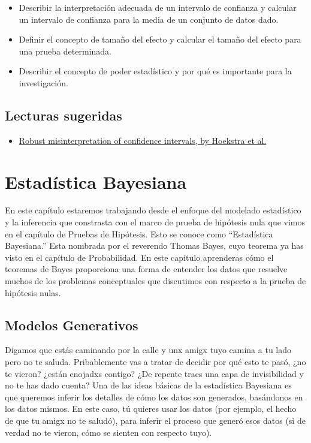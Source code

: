 \documentclass[
  12pt,
]{book}
\providecommand{\tightlist}{%
  \setlength{\itemsep}{0pt}\setlength{\parskip}{0pt}}
\theoremstyle{definition}
\theoremstyle{definition}
\theoremstyle{definition}
\theoremstyle{remark}
\begin{document}
\begin{itemize}
\tightlist
\item
  Describir la interpretación adecuada de un intervalo de confianza y calcular un intervalo de confianza para la media de un conjunto de datos dado.
\item
  Definir el concepto de tamaño del efecto y calcular el tamaño del efecto para una prueba determinada.
\item
  Describir el concepto de poder estadístico y por qué es importante para la investigación.
\end{itemize}

\hypertarget{lecturas-sugeridas}{%
\section{Lecturas sugeridas}\label{lecturas-sugeridas}}

\begin{itemize}
\tightlist
\item
  \href{http://www.ejwagenmakers.com/inpress/HoekstraEtAlPBR.pdf}{Robust misinterpretation of confidence intervals, by Hoekstra et al.}
\end{itemize}

\hypertarget{estaduxedstica-bayesiana}{%
\chapter{Estadística Bayesiana}\label{estaduxedstica-bayesiana}}

En este capítulo estaremos trabajando desde el enfoque del modelado estadístico y la inferencia que constrasta con el marco de prueba de hipótesis nula que vimos en el capítulo de Pruebas de Hipótesis.
Esto se conoce como ``Estadística Bayesiana.'' Esta nombrada por el reverendo Thomas Bayes, cuyo teorema ya has visto en el capítulo de Probabilidad. En este capítulo aprenderas cómo el teoremas de Bayes proporciona una forma de entender los datos que resuelve muchos de los problemas conceptuales que discutimos con respecto a la prueba de hipótesis nulas.

\hypertarget{modelos-generativos}{%
\section{Modelos Generativos}\label{modelos-generativos}}

Digamos que estás caminando por la calle y unx amigx tuyo camina a tu lado pero no te saluda. Pribablemente vas a tratar de decidir por qué esto te pasó, ¿no te vieron? ¿están enojadxs contigo? ¿De repente traes una capa de invisibilidad y no te has dado cuenta? Una de las ideas básicas de la estadística Bayesiana es que queremos inferir los detalles de cómo los datos son generados, basándonos en los datos mismos. En este caso, tú quieres usar los datos (por ejemplo, el hecho de que tu amigx no te saludó), para inferir el proceso que generó esos datos (si de verdad no te vieron, cómo se sienten con respecto tuyo).
\end{document}
